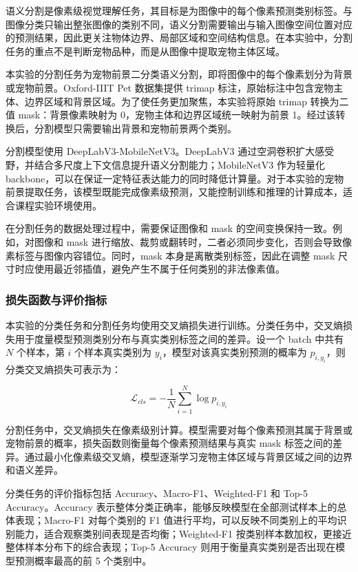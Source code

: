 \documentclass[UTF8,a4paper,12pt]{ctexart}
\begin{document}
语义分割是像素级视觉理解任务，其目标是为图像中的每个像素预测类别标签。与图像分类只输出整张图像的类别不同，语义分割需要输出与输入图像空间位置对应的预测结果，因此更关注物体边界、局部区域和空间结构信息。在本实验中，分割任务的重点不是判断宠物品种，而是从图像中提取宠物主体区域。

本实验的分割任务为宠物前景二分类语义分割，即将图像中的每个像素划分为背景或宠物前景。Oxford-IIIT Pet 数据集提供 trimap 标注，原始标注中包含宠物主体、边界区域和背景区域。为了使任务更加聚焦，本实验将原始 trimap 转换为二值 mask：背景像素映射为 0，宠物主体和边界区域统一映射为前景 1。经过该转换后，分割模型只需要输出背景和宠物前景两个类别。

分割模型使用 DeepLabV3-MobileNetV3。DeepLabV3 通过空洞卷积扩大感受野，并结合多尺度上下文信息提升语义分割能力；MobileNetV3 作为轻量化 backbone，可以在保证一定特征表达能力的同时降低计算量。对于本实验的宠物前景提取任务，该模型既能完成像素级预测，又能控制训练和推理的计算成本，适合课程实验环境使用。

在分割任务的数据处理过程中，需要保证图像和 mask 的空间变换保持一致。例如，对图像和 mask 进行缩放、裁剪或翻转时，二者必须同步变化，否则会导致像素标签与图像内容错位。同时，mask 本身是离散类别标签，因此在调整 mask 尺寸时应使用最近邻插值，避免产生不属于任何类别的非法像素值。

\subsubsection{损失函数与评价指标}
\label{sec:principle-loss-metrics}

本实验的分类任务和分割任务均使用交叉熵损失进行训练。分类任务中，交叉熵损失用于度量模型预测类别分布与真实类别标签之间的差异。设一个 batch 中共有 $N$ 个样本，第 $i$ 个样本真实类别为 $y_i$，模型对该真实类别预测的概率为 $p_{i,y_i}$，则分类交叉熵损失可表示为：

\[
\mathcal{L}_{cls}=-\frac{1}{N}\sum_{i=1}^{N}\log p_{i,y_i}
\]

分割任务中，交叉熵损失在像素级别计算。模型需要对每个像素预测其属于背景或宠物前景的概率，损失函数则衡量每个像素预测结果与真实 mask 标签之间的差异。通过最小化像素级交叉熵，模型逐渐学习宠物主体区域与背景区域之间的边界和语义差异。

分类任务的评价指标包括 Accuracy、Macro-F1、Weighted-F1 和 Top-5 Accuracy。Accuracy 表示整体分类正确率，能够反映模型在全部测试样本上的总体表现；Macro-F1 对每个类别的 F1 值进行平均，可以反映不同类别上的平均识别能力，适合观察类别间表现是否均衡；Weighted-F1 按类别样本数加权，更接近整体样本分布下的综合表现；Top-5 Accuracy 则用于衡量真实类别是否出现在模型预测概率最高的前 5 个类别中。
\end{document}
